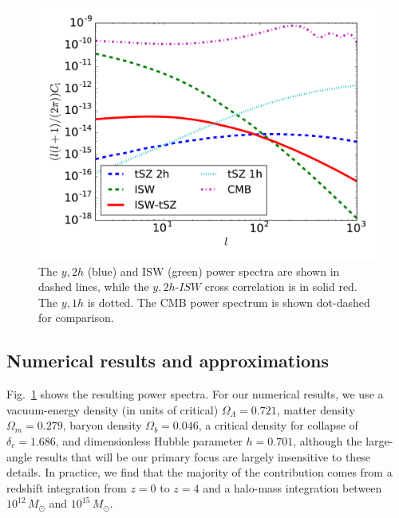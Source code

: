\documentclass[aps,twocolumn,floats,prd,nofootinbib]{revtex4-1}
\begin{document}
\begin{figure}[h]
\includegraphics[width=10 cm, height = 7 cm]{ISWtsz.pdf}
    \caption{The $y,2h$ (blue) and ISW (green) power spectra 
     are shown in dashed lines, while the $y,2h$-$ISW$ cross 
     correlation is in solid red. The $y, 1h$ is dotted. 
     The CMB power spectrum is shown dot-dashed for comparison.} 
\label{fig:power}
\end{figure}

\subsection{Numerical results and approximations}

Fig.~\ref{fig:power} shows the resulting power spectra.  
For our numerical results, we use a vacuum-energy density (in
units of critical) $\Omega_{\Lambda} = 0.721$, matter density
$\Omega_m = 0.279$, baryon density $\Omega_b = 0.046$, a
critical density for collapse of $\delta_c = 1.686$, and
dimensionless Hubble parameter $h= 0.701$, although the
large-angle results that will be our primary focus are largely
insensitive to these details.  In practice, we find that the
majority of the contribution comes from a redshift integration
from $z=0$ to $z=4$ and a halo-mass integration between
$10^{12}\,M_\odot$ and $10^{15}\,M_\odot$.
\end{document}
